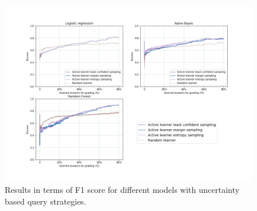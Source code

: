 \begin{figure}[!htb]
	\centering
	\includegraphics[scale=0.46]{images/binary/task8_f1score_uncertainty}
	\caption{Results in terms of F1 score for different models with uncertainty based query strategies.}
	\label{t8_b_uncertainty_f1}
\end{figure}


